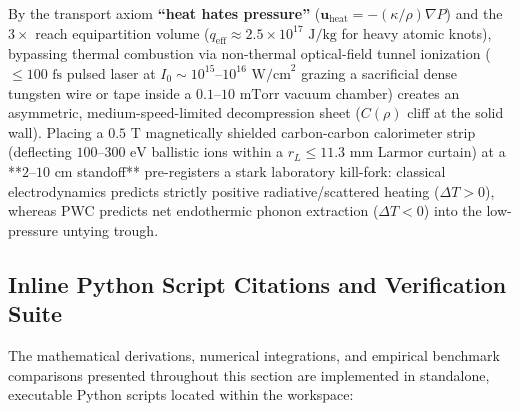 \documentclass[11pt,a4paper]{article}
\begin{document}
By the transport axiom \textbf{``heat hates pressure''} ($\mathbf{u}_{\text{heat}} = -(\kappa/\rho)\nabla P$) and the $3\times$ reach equipartition volume ($q_{\text{eff}} \approx 2.5 \times 10^{17}\text{ J/kg}$ for heavy atomic knots), bypassing thermal combustion via non-thermal optical-field tunnel ionization ($\le 100\text{ fs}$ pulsed laser at $I_0 \sim 10^{15}\text{--}10^{16}\text{ W/cm}^2$ grazing a sacrificial dense tungsten wire or tape inside a $0.1\text{--}10\text{ mTorr}$ vacuum chamber) creates an asymmetric, medium-speed-limited decompression sheet ($C(\rho)$ cliff at the solid wall). Placing a $0.5\text{ T}$ magnetically shielded carbon-carbon calorimeter strip (deflecting $100\text{--}300\text{ eV}$ ballistic ions within a $r_L \le 11.3\text{ mm}$ Larmor curtain) at a **$2\text{--}10\text{ cm}$ standoff** pre-registers a stark laboratory kill-fork: classical electrodynamics predicts strictly positive radiative/scattered heating ($\Delta T > 0$), whereas PWC predicts net endothermic phonon extraction ($\Delta T < 0$) into the low-pressure untying trough.


\subsection{Inline Python Script Citations and Verification Suite}
\label{subsec:inline_script_citations}

The mathematical derivations, numerical integrations, and empirical benchmark comparisons presented throughout this section are implemented in standalone, executable Python scripts located within the workspace:
\end{document}
